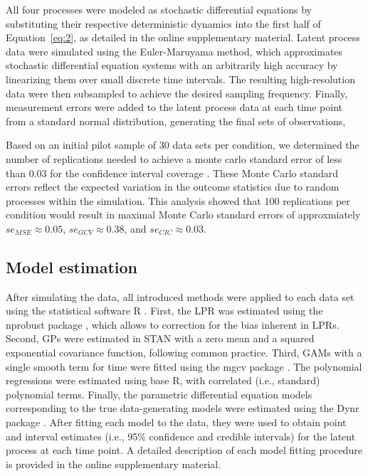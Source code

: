 \documentclass[man, floatsintext]{apa7}
\begin{document}
All four processes were modeled as stochastic differential equations by
substituting their respective deterministic dynamics into the first half of
Equation~\ref{eq:2}, as detailed in the online supplementary material. Latent
process data were simulated using the Euler-Maruyama method, which approximates
stochastic differential equation systems with an arbitrarily high accuracy by
linearizing them over small discrete time intervals. The resulting
high-resolution data were then subsampled to achieve the desired sampling
frequency. Finally, measurement errors were added to the latent process data at
each time point from a standard normal distribution, generating the final sets
of observations,

Based on an initial pilot sample of 30 data sets per condition, we determined
the number of replications needed to achieve a monte carlo standard error of
less than 0.03 for the confidence interval coverage
\parencite{siepe_simulation_2023}. These Monte Carlo standard errors reflect
the expected variation in the outcome statistics due to random processes within
the simulation. This analysis showed that 100 replications per condition
would result in maximal Monte Carlo standard errors of approxmiately $se_{MSE}
  \approx 0.05$, $se_{GCV} \approx 0.38$, and $se_{CIC} \approx 0.03$.

\subsection{Model estimation}

After simulating the data, all introduced methods were applied to each data set
using the statistical software R \parencite{R-base}. First, the LPR was
estimated using the nprobust package \parencite{R-nprobust}, which allows to
correction for the bias inherent in LPRs. Second, GPs were estimated in STAN
\parencite{R-cmdstanr} with a zero mean and a squared exponential covariance
function, following common practice. Third, GAMs with a single smooth term for
time were fitted using the mgcv package \parencite{R-mgcv_a}. The polynomial
regressions were estimated using base R, with correlated (i.e.,
standard) polynomial terms. Finally, the
parametric differential equation models corresponding to the true
data-generating models were estimated using the Dynr package
\parencite{R-dynr}. After fitting each model to the data, they were used
to obtain point and interval estimates (i.e., 95\% confidence and credible
intervals) for the latent process at each time point. A detailed description of
each model fitting procedure is provided in the online supplementary material.
\end{document}

